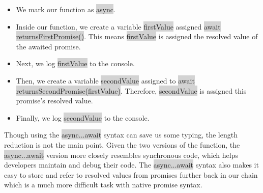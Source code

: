 \documentclass[11pt]{article}
\begin{document}
\begin{itemize}[leftmargin = *]
\item We mark our function as \colorbox{lightgray}{async}.
\item Inside our function, we create a variable \colorbox{lightgray}{firstValue} assigned \colorbox{lightgray}{await returnsFirstPromise()}. This means \colorbox{lightgray}{firstValue} is assigned the resolved value of the awaited promise.
\item Next, we log \colorbox{lightgray}{firstValue} to the console.
\item Then, we create a variable \colorbox{lightgray}{secondValue} assigned to \colorbox{lightgray}{await returnsSecondPromise(firstValue)}. Therefore, \colorbox{lightgray}{secondValue} is assigned this promise’s resolved value.
\item Finally, we log \colorbox{lightgray}{secondValue} to the console.
\end{itemize}
Though using the \colorbox{lightgray}{async...await} syntax can save us some typing, the length reduction is not the main point. Given the two versions of the function, the \colorbox{lightgray}{async...await} version more closely resembles synchronous code, which helps developers maintain and debug their code. The \colorbox{lightgray}{async...await} syntax also makes it easy to store and refer to resolved values from promises further back in our chain which is a much more difficult task with native promise syntax. 
\end{document}
